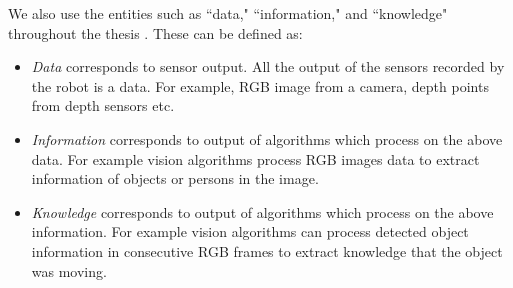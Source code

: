 We also use the entities such as ``data," ``information," and ``knowledge" throughout the thesis \cite{niemueller2012generic}. These can be defined as:
\begin{itemize}
	\item \emph{Data} corresponds to sensor output. All the output of the sensors recorded by the robot is a data. For example, RGB image from a camera, depth points from depth sensors etc.
	\item \emph{Information} corresponds to output of algorithms which process on the above data. For example vision algorithms process RGB images data to extract information of objects or persons in the image.
	\item \emph{Knowledge} corresponds to output of algorithms which process on the above information. For example vision algorithms can process detected object information in consecutive RGB frames to extract knowledge that the object was moving.
\end{itemize}

